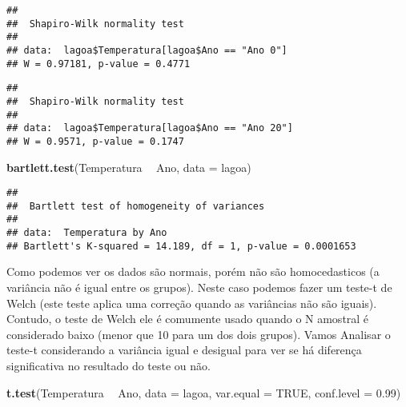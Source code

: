 \documentclass[titlepage, oneside, openany, a4paper]{book}
\newenvironment{Shaded}{\begin{snugshade}}{\end{snugshade}}
\newcommand{\DataTypeTok}[1]{\textcolor[rgb]{0.13,0.29,0.53}{#1}}
\newcommand{\FloatTok}[1]{\textcolor[rgb]{0.00,0.00,0.81}{#1}}
\newcommand{\KeywordTok}[1]{\textcolor[rgb]{0.13,0.29,0.53}{\textbf{#1}}}
\newcommand{\NormalTok}[1]{#1}
\newcommand{\OperatorTok}[1]{\textcolor[rgb]{0.81,0.36,0.00}{\textbf{#1}}}
\newcommand{\OtherTok}[1]{\textcolor[rgb]{0.56,0.35,0.01}{#1}}
\newcommand{\StringTok}[1]{\textcolor[rgb]{0.31,0.60,0.02}{#1}}
\begin{document}
\begin{verbatim}
## 
##  Shapiro-Wilk normality test
## 
## data:  lagoa$Temperatura[lagoa$Ano == "Ano 0"]
## W = 0.97181, p-value = 0.4771
\end{verbatim}

\begin{Shaded}
\end{Shaded}

\begin{verbatim}
## 
##  Shapiro-Wilk normality test
## 
## data:  lagoa$Temperatura[lagoa$Ano == "Ano 20"]
## W = 0.9571, p-value = 0.1747
\end{verbatim}

\begin{Shaded}
\begin{Highlighting}[]
\KeywordTok{bartlett.test}\NormalTok{(Temperatura }\OperatorTok{~}\StringTok{ }\NormalTok{Ano, }\DataTypeTok{data =}\NormalTok{ lagoa)}
\end{Highlighting}
\end{Shaded}

\begin{verbatim}
## 
##  Bartlett test of homogeneity of variances
## 
## data:  Temperatura by Ano
## Bartlett's K-squared = 14.189, df = 1, p-value = 0.0001653
\end{verbatim}

Como podemos ver os dados são normais, porém não são homocedasticos (a variância não é igual entre os grupos). Neste caso podemos fazer um teste-t de Welch (este teste aplica uma correção quando as variâncias não são iguais). Contudo, o teste de Welch ele é comumente usado quando o N amostral é considerado baixo (menor que 10 para um dos dois grupos). Vamos Analisar o teste-t considerando a variância igual e desigual para ver se há diferença significativa no resultado do teste ou não.

\begin{Shaded}
\begin{Highlighting}[]
\KeywordTok{t.test}\NormalTok{(Temperatura }\OperatorTok{~}\StringTok{ }\NormalTok{Ano, }
       \DataTypeTok{data =}\NormalTok{ lagoa,}
       \DataTypeTok{var.equal =} \OtherTok{TRUE}\NormalTok{,}
       \DataTypeTok{conf.level =} \FloatTok{0.99}\NormalTok{)}
\end{Highlighting}
\end{Shaded}
\end{document}
